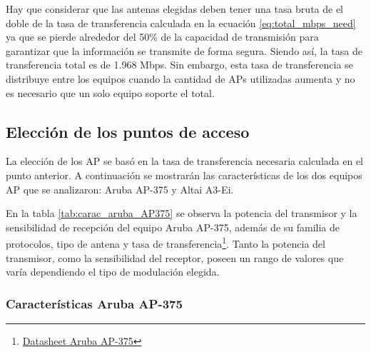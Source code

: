 \documentclass[11pt,a4paper]{article}
\begin{document}
Hay que considerar que las antenas elegidas deben tener una tasa bruta de el doble de la tasa de transferencia calculada en la ecuación \ref{eq:total_mbps_need} ya que se pierde alrededor del 50\% de la capacidad de transmisión para garantizar que  la información se transmite de forma segura. 
Siendo así, la tasa de transferencia total es de 1.968 Mbps. 
Sin embargo, esta tasa de transferencia se distribuye entre los equipos cuando la cantidad de APs utilizadas aumenta y no es necesario que un solo equipo soporte el total. 

\subsection{Elección de los puntos de acceso}

La elección de los AP se basó en la tasa de transferencia necesaria calculada en el punto anterior. 
A continuación se mostrarán las características de los dos equipos AP que se analizaron: Aruba AP-375 y Altai A3-Ei.

En la tabla \ref{tab:carac_aruba_AP375} se observa la potencia del transmisor y la sensibilidad de recepción del equipo Aruba AP-375, además de su familia de protocolos, tipo de antena y tasa de transferencia\footnote{\href{https://www.arubanetworks.com/assets/ds/DS_AP370Series.pdf}{Datasheet Aruba AP-375}}. 
Tanto la potencia del transmisor, como la sensibilidad del receptor, poseen un rango de valores que varía dependiendo el tipo de modulación elegida.

\subsubsection{Características Aruba AP-375}

\begin{table}[htbp]
\caption{características de AP Aruba AP-375.}
\label{tab:carac_aruba_AP375}
\end{table}
\end{document}
